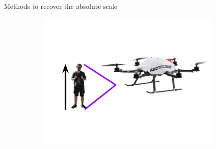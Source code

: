 \documentclass{beamer}
\begin{document}


\begin{frame}{Methods to recover the absolute scale}

  \begin{figure}
    \centering
    \begin{subfigure}[b]{0.3\textwidth}
      \includegraphics[width=\textwidth]{images/referenceInEnv.png}
    \end{subfigure}
\end{figure}
\end{frame}
\end{document}
